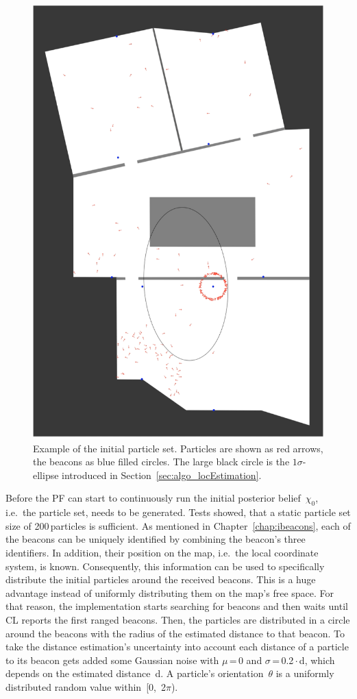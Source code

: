 \begin{figure}
\includegraphics[height=0.7\textwidth]{figures/algo_particle_generation}
\caption{Example of the initial particle set. Particles are shown as red arrows, the beacons as blue filled circles. The large black circle is the $1\sigma$-ellipse introduced in Section~\ref{sec:algo_locEstimation}.}
\label{fig:pf_initialDist}
\end{figure}

Before the \ac{PF} can start to continuously run the initial posterior belief~$\chi_0$, i.e.\ the particle set, needs to be generated. Tests showed, that a static particle set size of 200\,particles is sufficient. As mentioned in Chapter~\ref{chap:ibeacons}, each of the beacons can be uniquely identified by combining the beacon's three identifiers. In addition, their position on the map, i.e.\ the local coordinate system, is known. Consequently, this information can be used to specifically distribute the initial particles around the received beacons. This is a huge advantage instead of uniformly distributing them on the map's free space. For that reason, the implementation starts searching for beacons and then waits until \ac{CL} reports the first ranged beacons. Then, the particles are distributed in a circle around the beacons with the radius of the estimated distance to that beacon. To take the distance estimation's uncertainty into account each distance of a particle to its beacon gets added some Gaussian noise with $\mu$\,=\,0 and $\sigma$\,=\,0.2\,$\cdot$\,d, which depends on the estimated distance~d. A particle's orientation~$\theta$ is a uniformly distributed random value within~[0,~2$\pi$).

